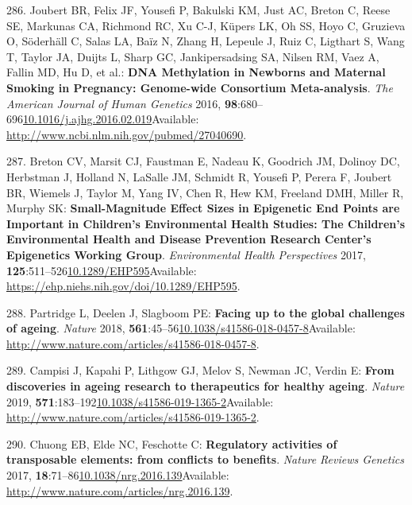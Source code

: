 \documentclass[
]{book}
\begin{document}
\leavevmode\hypertarget{ref-Joubert2016}{}%
286. Joubert BR, Felix JF, Yousefi P, Bakulski KM, Just AC, Breton C, Reese SE, Markunas CA, Richmond RC, Xu C-J, Küpers LK, Oh SS, Hoyo C, Gruzieva O, Söderhäll C, Salas LA, Baïz N, Zhang H, Lepeule J, Ruiz C, Ligthart S, Wang T, Taylor JA, Duijts L, Sharp GC, Jankipersadsing SA, Nilsen RM, Vaez A, Fallin MD, Hu D, et al.: \textbf{DNA Methylation in Newborns and Maternal Smoking in Pregnancy: Genome-wide Consortium Meta-analysis}. \emph{The American Journal of Human Genetics} 2016, \textbf{98}:680--696\href{https://doi.org/10.1016/j.ajhg.2016.02.019}{10.1016/j.ajhg.2016.02.019}Available: \url{http://www.ncbi.nlm.nih.gov/pubmed/27040690}.

\leavevmode\hypertarget{ref-Breton2017}{}%
287. Breton CV, Marsit CJ, Faustman E, Nadeau K, Goodrich JM, Dolinoy DC, Herbstman J, Holland N, LaSalle JM, Schmidt R, Yousefi P, Perera F, Joubert BR, Wiemels J, Taylor M, Yang IV, Chen R, Hew KM, Freeland DMH, Miller R, Murphy SK: \textbf{Small-Magnitude Effect Sizes in Epigenetic End Points are Important in Children's Environmental Health Studies: The Children's Environmental Health and Disease Prevention Research Center's Epigenetics Working Group}. \emph{Environmental Health Perspectives} 2017, \textbf{125}:511--526\href{https://doi.org/10.1289/EHP595}{10.1289/EHP595}Available: \url{https://ehp.niehs.nih.gov/doi/10.1289/EHP595}.

\leavevmode\hypertarget{ref-Partridge2018}{}%
288. Partridge L, Deelen J, Slagboom PE: \textbf{Facing up to the global challenges of ageing}. \emph{Nature} 2018, \textbf{561}:45--56\href{https://doi.org/10.1038/s41586-018-0457-8}{10.1038/s41586-018-0457-8}Available: \url{http://www.nature.com/articles/s41586-018-0457-8}.

\leavevmode\hypertarget{ref-Campisi2019}{}%
289. Campisi J, Kapahi P, Lithgow GJ, Melov S, Newman JC, Verdin E: \textbf{From discoveries in ageing research to therapeutics for healthy ageing}. \emph{Nature} 2019, \textbf{571}:183--192\href{https://doi.org/10.1038/s41586-019-1365-2}{10.1038/s41586-019-1365-2}Available: \url{http://www.nature.com/articles/s41586-019-1365-2}.

\leavevmode\hypertarget{ref-Chuong2017}{}%
290. Chuong EB, Elde NC, Feschotte C: \textbf{Regulatory activities of transposable elements: from conflicts to benefits}. \emph{Nature Reviews Genetics} 2017, \textbf{18}:71--86\href{https://doi.org/10.1038/nrg.2016.139}{10.1038/nrg.2016.139}Available: \url{http://www.nature.com/articles/nrg.2016.139}.
\end{document}
